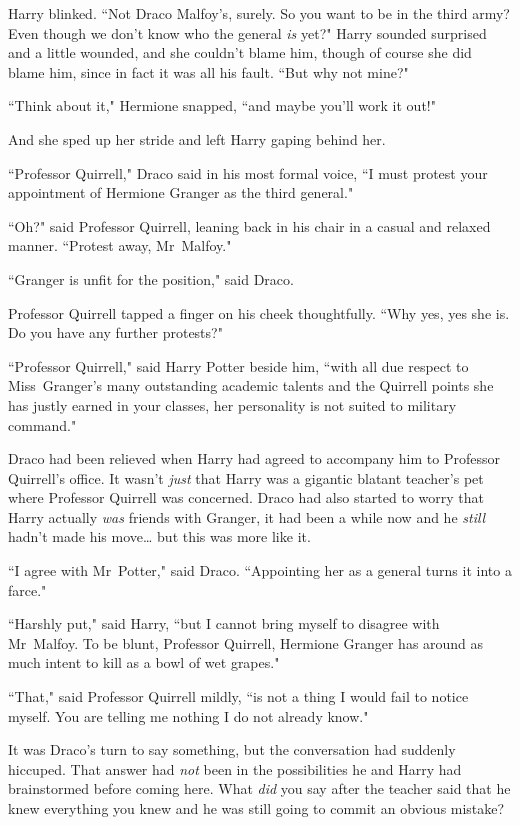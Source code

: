 Harry blinked. ``Not Draco Malfoy's, surely. So you want to be in the third army? Even though we don't know who the general \emph{is} yet?" Harry sounded surprised and a little wounded, and she couldn't blame him, though of course she did blame him, since in fact it was all his fault. ``But why not mine?"

``Think about it," Hermione snapped, ``and maybe you'll work it out!"

And she sped up her stride and left Harry gaping behind her.

\later

``Professor Quirrell," Draco said in his most formal voice, ``I must protest your appointment of Hermione Granger as the third general."

``Oh?" said Professor Quirrell, leaning back in his chair in a casual and relaxed manner. ``Protest away, Mr~Malfoy."

``Granger is unfit for the position," said Draco.

Professor Quirrell tapped a finger on his cheek thoughtfully. ``Why yes, yes she is. Do you have any further protests?"

``Professor Quirrell," said Harry Potter beside him, ``with all due respect to Miss~Granger's many outstanding academic talents and the Quirrell points she has justly earned in your classes, her personality is not suited to military command."

Draco had been relieved when Harry had agreed to accompany him to Professor Quirrell's office. It wasn't \emph{just} that Harry was a gigantic blatant teacher's pet where Professor Quirrell was concerned. Draco had also started to worry that Harry actually \emph{was} friends with Granger, it had been a while now and he \emph{still} hadn't made his move{\ldots} but this was more like it.

``I agree with Mr~Potter," said Draco. ``Appointing her as a general turns it into a farce."

``Harshly put," said Harry, ``but I cannot bring myself to disagree with Mr~Malfoy. To be blunt, Professor Quirrell, Hermione Granger has around as much intent to kill as a bowl of wet grapes."

``That," said Professor Quirrell mildly, ``is not a thing I would fail to notice myself. You are telling me nothing I do not already know."

It was Draco's turn to say something, but the conversation had suddenly hiccuped. That answer had \emph{not} been in the possibilities he and Harry had brainstormed before coming here. What \emph{did} you say after the teacher said that he knew everything you knew and he was still going to commit an obvious mistake?

